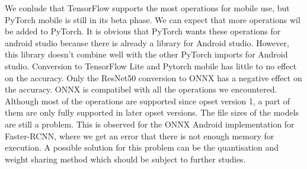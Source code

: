
We conlude that TensorFlow supports the most operations for mobile use, but PyTorch mobile is still in its beta phase.
We can expect that more operations wil be added to PyTorch.
It is obvious that PyTorch wants these operations for android studio because there is already a library for Android studio.
However, this library doesn't combine well with the other PyTorch imports for Android studio.
Conversion to TensorFlow Lite and Pytorch mobile has little to no effect on the accuracy.
Only the ResNet50 conversion to ONNX has a negative effect on the accuracy.
ONNX is compatibel with all the operations we encountered.
Although most of the operations are supported since opset version 1, a part of them are only fully supported in later opset versions.
The file sizes of the models are still a problem.
This is observed for the ONNX Android implementation for Faster-RCNN, where we get an error that there is not enough memory for execution.
A possible solution for this problem can be the quantisation and weight sharing method which should be subject to further studies.

